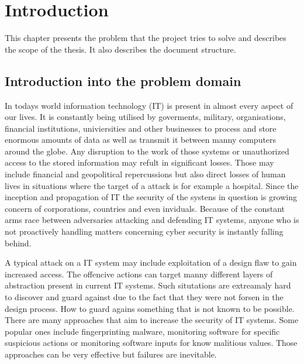 \documentclass[a4paper,twoside,12pt]{book}
\newcounter{PagesWithoutNumbers}
\begin{document}
\vfill
 
 

\cleardoublepage


\pagestyle{onlyPageNumbers}
\tableofcontents

\setcounter{PagesWithoutNumbers}{\value{page}}
\mainmatter
\pagestyle{PageNumbersChapterTitles}


\chapter{Introduction}

This chapter presents the problem that the project tries to solve and describes the scope 
of the thesis. It also describes the document structure.



\section{Introduction into the problem domain}


In todays world information technology (IT) is present in almost every aspect of our lives. 
It is constantly being utilised by goverments, military, organisations, financial institutions,
univiersities and other businesses to process and store enormous amounts of data as well as 
transmit it between manny computers around the globe. Any disruption to the work of those 
systems or unauthorized access to the stored information may refult in significant losses.
Those may include financial and geopolitical repercussions but also direct losses of human
lives in situations where the target of a attack is for example a hospital. Since the inception
and propagation of IT the security of the systens in question is growing concern of corporations, 
countries and even inviduals. Because of the constant arms race between adversaries attacking 
and defending IT systems, anyone who is not proactively handling matters concerning cyber security 
is instantly falling behind. \cite{bib:articleImportanceOfCybersecurity} 

A typical attack on a IT system may include exploitation of a design 
flaw to gain increased access. The offencive actions can target manny different layers of 
abstraction present in current IT systems. Such situtations are extreamaly hard to discover 
and guard against due to the fact that they were not forsen in the design process. How to guard 
agains something that is not known to be possible. There are many approaches that aim to 
increase the security of IT systems. Some popular ones include fingerprinting malware, 
monitoring software for specific suspicious actions or monitoring software inputs for know 
malitious values. Those approaches can be very effective but failures are inevitable.
\end{document}
